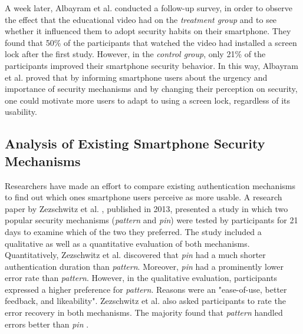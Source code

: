 A week later, Albayram et al. \cite{Albayram:2017:BUL:3235924.3235929} conducted a follow-up survey, in order to observe the effect that the educational video had on the \textit{treatment group} and to see whether it influenced them to adopt security habits on their smartphone. They found that 50\% of the participants that watched the video had installed a screen lock after the first study. However, in the \textit{control group}, only 21\% of the participants improved their smartphone security behavior. In this way, Albayram et al. \cite{Albayram:2017:BUL:3235924.3235929} proved that by informing smartphone users about the urgency and importance of security mechanisms and by changing their perception on security, one could motivate more users to adapt to using a screen lock, regardless of its usability. 

\subsection{Analysis of Existing Smartphone Security Mechanisms} \label{2.2.2}

Researchers have made an effort to compare existing authentication mechanisms to find out which ones smartphone users perceive as more usable. A research paper by Zezschwitz et al. \cite{PatternWild}, published in 2013, presented a study in which two popular security mechanisms (\textit{pattern} and \textit{pin}) were tested by participants for 21 days to examine which of the two they preferred. The study included a qualitative as well as a quantitative evaluation of both mechanisms. Quantitatively, Zezschwitz et al. \cite{PatternWild} discovered that \textit{pin} had a much shorter authentication duration than \textit{pattern}. Moreover, \textit{pin} had a prominently lower error rate than \textit{pattern}. However, in the qualitative evaluation, participants expressed a higher preference for \textit{pattern}. Reasons were an "ease-of-use, better feedback, and likeability". Zezschwitz et al. \cite{PatternWild} also asked participants to rate the error recovery in both mechanisms. The majority found that \textit{pattern} handled errors better than \textit{pin}  \cite{PatternWild}.\\

